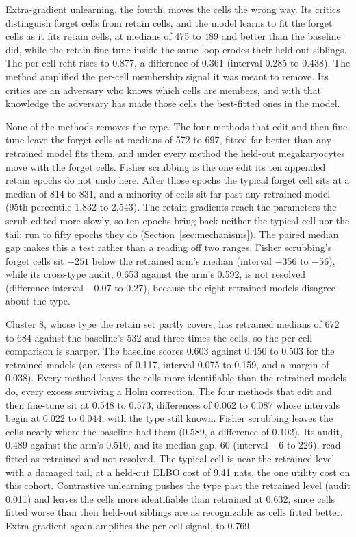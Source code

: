 \documentclass{article}
\begin{document}
Extra-gradient unlearning, the fourth, moves the cells the wrong way. Its critics distinguish forget cells from retain cells, and the model learns to fit the forget cells as it fits retain cells, at medians of 475 to 489 and better than the baseline did, while the retain fine-tune inside the same loop erodes their held-out siblings. The per-cell refit rises to 0.877, a difference of 0.361 (interval 0.285 to 0.438). The method amplified the per-cell membership signal it was meant to remove. Its critics are an adversary who knows which cells are members, and with that knowledge the adversary has made those cells the best-fitted ones in the model.

None of the methods removes the type. The four methods that edit and then fine-tune leave the forget cells at medians of 572 to 697, fitted far better than any retrained model fits them, and under every method the held-out megakaryocytes move with the forget cells. Fisher scrubbing is the one edit its ten appended retain epochs do not undo here. After those epochs the typical forget cell sits at a median of 814 to 831, and a minority of cells sit far past any retrained model (95th percentile 1,832 to 2,543). The retain gradients reach the parameters the scrub edited more slowly, so ten epochs bring back neither the typical cell nor the tail; run to fifty epochs they do (Section~\ref{sec:mechanisms}). The paired median gap makes this a test rather than a reading off two ranges. Fisher scrubbing's forget cells sit $-251$ below the retrained arm's median (interval $-356$ to $-56$), while its cross-type audit, 0.653 against the arm's 0.592, is not resolved (difference interval $-0.07$ to 0.27), because the eight retrained models disagree about the type.

Cluster 8, whose type the retain set partly covers, has retrained medians of 672 to 684 against the baseline's 532 and three times the cells, so the per-cell comparison is sharper. The baseline scores 0.603 against 0.450 to 0.503 for the retrained models (an excess of 0.117, interval 0.075 to 0.159, and a margin of 0.038). Every method leaves the cells more identifiable than the retrained models do, every excess surviving a Holm correction. The four methods that edit and then fine-tune sit at 0.548 to 0.573, differences of 0.062 to 0.087 whose intervals begin at 0.022 to 0.044, with the type still known. Fisher scrubbing leaves the cells nearly where the baseline had them (0.589, a difference of 0.102). Its audit, 0.489 against the arm's 0.510, and its median gap, 60 (interval $-6$ to 226), read fitted as retrained and not resolved. The typical cell is near the retrained level with a damaged tail, at a held-out ELBO cost of 9.41 nats, the one utility cost on this cohort. Contrastive unlearning pushes the type past the retrained level (audit 0.011) and leaves the cells more identifiable than retrained at 0.632, since cells fitted worse than their held-out siblings are as recognizable as cells fitted better. Extra-gradient again amplifies the per-cell signal, to 0.769.
\end{document}
